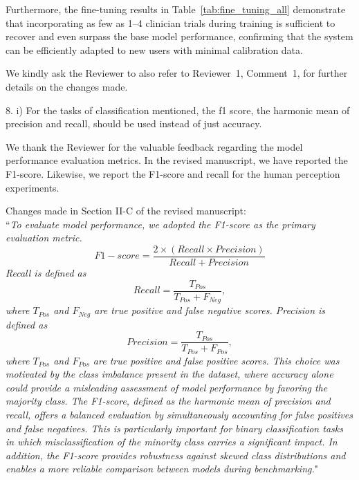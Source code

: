 \documentclass[a4paper, onecolumn]{IEEEtran}
\newcommand\blue[1]{{\textcolor{white!30!blue}{#1}}}
\begin{document}
Furthermore, the fine-tuning results in Table~\ref{tab:fine_tuning_all} demonstrate that incorporating as few as 1--4 clinician trials during training is sufficient to recover and even surpass the base model performance, confirming that the system can be efficiently adapted to new users with minimal calibration data.

We kindly ask the Reviewer to also refer to Reviewer~1, Comment~1, for further details on the changes made. 

\blue{8. i) For the tasks of classification mentioned, the f1 score, the harmonic mean of precision and recall, should be used instead of just accuracy.}

We thank the Reviewer for the valuable feedback regarding the model performance evaluation metrics. In the revised manuscript, we have reported the F1-score. Likewise, we report the F1-score and recall for the human perception experiments.

Changes made in Section II-C of the revised manuscript: \\
``\textit{To evaluate model performance, we adopted the F1-score as the primary evaluation metric.} 
\begin{equation}
    F1-score=\frac{2\times(Recall{\times}Precision)}{Recall{+}Precision}
    \label{eq:f1}
\end{equation}
\textit{Recall is defined as }
\begin{equation}
    Recall = \frac{T_{Pos}}{T_{Pos} + F_{Neg}},
    \label{eq:recall}
\end{equation}
\textit{where $T_{Pos}$ and $F_{Neg}$  are true positive and false negative scores.
Precision is defined as }
\begin{equation}
    Precision = \frac{T_{Pos}}{T_{Pos} + F_{Pos}},
    \label{eq:precision}
\end{equation}
\textit{where $T_{Pos}$ and $F_{Pos}$  are true positive and false positive scores.
This choice was motivated by the class imbalance present in the dataset, where accuracy alone could provide a misleading assessment of model performance by favoring the majority class. The F1-score, defined as the harmonic mean of precision and recall, offers a balanced evaluation by simultaneously accounting for false positives and false negatives. This is particularly important for binary classification tasks in which misclassification of the minority class carries a significant impact. In addition, the F1-score provides robustness against skewed class distributions and enables a more reliable comparison between models during benchmarking.}"
\end{document}
